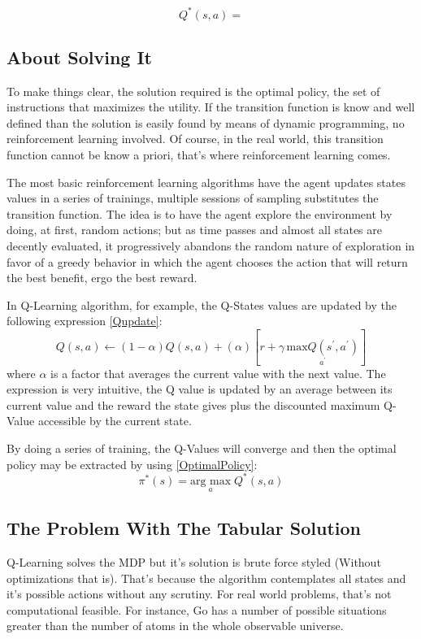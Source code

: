 \begin{equation} \label{Bellman2}
Q^*\left(s,a\right) = 
\end{equation}

\subsection{About Solving It}
To make things clear, the solution required is the optimal policy, the set of instructions that maximizes the utility. If the transition function is know and well defined than the solution is easily found by means of dynamic programming, no reinforcement learning involved. Of course, in the real world, this transition function cannot be know a priori, that's where reinforcement learning comes.

The most basic reinforcement learning algorithms have the agent updates states values in a series of trainings, multiple sessions of sampling substitutes the transition function. The idea is to have the agent explore the environment by doing, at first, random actions; but as time passes and almost all states are decently evaluated, it progressively abandons the random nature of exploration in favor of a greedy behavior in which the agent chooses the action that will return the best benefit, ergo the best reward.

In Q-Learning algorithm, for example, the Q-States values are updated by the following expression \ref{Qupdate}:
\begin{equation} \label{Qupdate}
Q\left(s,a\right) \leftarrow \left(1 - \alpha\right)Q\left(s,a\right) + \left(\alpha\right)\left[r + \gamma\,\underset{a^\prime}{\text{max}Q\left(s^\prime,a^\prime\right)} \right]
\end{equation}
where $\alpha$ is a factor that averages the current value with the next value. The expression is very intuitive, the Q value is updated by an average between its current value and the reward the state gives plus the discounted maximum Q-Value accessible by the current state.

By doing a series of training, the Q-Values will converge and then the optimal policy may be extracted by using \ref{OptimalPolicy}:
\begin{equation} \label{OptimalPolicy}
\pi^*\left(s\right) = \underset{a}{\text{arg max}}\;Q^*\left(s,a\right)
\end{equation}

\subsection{The Problem With The Tabular Solution}
Q-Learning solves the MDP but it's solution is brute force styled (Without optimizations that is). That's because  the algorithm contemplates all states and it's possible actions without any scrutiny. For real world problems, that's not computational feasible. For instance, Go has a number of possible situations greater than the number of atoms in the whole observable universe.

